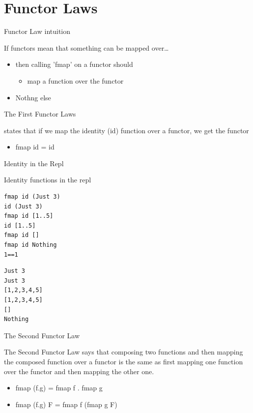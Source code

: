 \documentclass[presetation]{beamer}
\begin{document}
\section{Functor Laws}
\label{sec:orgdd55417}
\begin{frame}[label={sec:org3a5933c}]{Functor Law intuition}
\begin{block}{If functors mean that something can be mapped over\ldots{}}
\begin{itemize}
\item then calling 'fmap' on a functor should
\begin{itemize}
\item map a function over the functor
\end{itemize}
\end{itemize}
\pause
\begin{itemize}
\item \alert{Nothng else}
\end{itemize}
\end{block}
\end{frame}

\begin{frame}[label={sec:orgf2e4a5d}]{The First Functor Laws}
\begin{definition}
states that if we map the identity (id) function over a functor, we
get the functor
\begin{itemize}
\item fmap id = id
\end{itemize}
\end{definition}
\end{frame}

\begin{frame}[fragile,label={sec:org421eaf9}]{Identity in the Repl}
 \begin{block}{Identity functions in the repl}
\begin{verbatim}
fmap id (Just 3)
id (Just 3)
fmap id [1..5]
id [1..5]
fmap id []
fmap id Nothing
1==1
\end{verbatim}

\begin{verbatim}
Just 3
Just 3
[1,2,3,4,5]
[1,2,3,4,5]
[]
Nothing
\end{verbatim}
\end{block}
\end{frame}

\begin{frame}[label={sec:org19db90a}]{The Second Functor Law}
\begin{definition}
The Second Functor Law says that composing two functions and then
mapping the composed function over a functor is the same as first
mapping one function over the functor and then mapping the other one.
\begin{itemize}
\item fmap (f.g) = fmap f . fmap g
\item fmap (f.g) F = fmap f (fmap g F)
\end{itemize}
\end{definition}
\end{frame}
\end{document}
